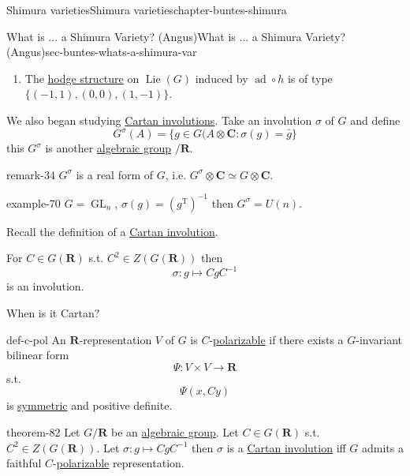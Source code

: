 \documentclass[oneside,10pt,]{book}
\numberwithin{equation}{section}
\newcommand{\Lie}{\operatorname{Lie}}
\newcommand{\inv}{^{-1}}
\newcommand{\RR}{\mathbf{R}}
\newcommand{\CC}{\mathbf{C}}
\newcommand{\transpose}{\mathrm{T}}
\DeclareMathOperator{\ad}{ad}
\DeclareMathOperator{\GL}{GL}
\begin{document}
\begin{chapterptx}{Shimura varieties}{}{Shimura varieties}{}{}{chapter-buntes-shimura}
\begin{sectionptx}{What is ... a Shimura Variety? (Angus)}{}{What is ... a Shimura Variety? (Angus)}{}{}{sec-buntes-whats-a-shimura-var}
\begin{enumerate}
%
\item\hypertarget{li-293}{}The \hyperref[def-hodge-str]{hodge structure} on \(\Lie(G)\) induced by \(\ad \circ h\) is of type \(\{(-1,1), (0,0), (1,-1)\}\).%
\end{enumerate}
%
\par
\hypertarget{p-1215}{}%
We also began studying \hyperref[def-cartan-inv]{Cartan involutions}. Take an involution \(\sigma\) of \(G\) and define%
\begin{equation*}
G^\sigma(A) = \{ g\in G(A \otimes \CC : \sigma(g) = \bar g\}
\end{equation*}
this \(G^\sigma\) is another \hyperref[def-alg-gp]{algebraic group} \(/\RR\).%
\begin{remark}{}{remark-34}%
\hypertarget{p-1216}{}%
\(G^\sigma\) is a real form of \(G\), i.e. \(G^\sigma \otimes \CC \simeq G \otimes \CC\).%
\end{remark}
\begin{example}{}{example-70}%
\hypertarget{p-1217}{}%
\(G  =\GL_n\), \(\sigma(g) = (g^\transpose)\inv\) then \(G^\sigma =  U(n)\).%
\end{example}
\hypertarget{p-1218}{}%
Recall the definition of a \hyperref[def-cartan-inv]{Cartan involution}.%
\par
\hypertarget{p-1219}{}%
For \(C \in G(\RR)\) s.t. \(C^2 \in Z(G(\RR))\) then%
\begin{equation*}
\sigma \colon g \mapsto CgC\inv
\end{equation*}
is an involution.%
\par
\hypertarget{p-1220}{}%
When is it Cartan?%
\begin{definition}{}{def-c-pol}%
\hypertarget{p-1221}{}%
An \(\RR\)-representation \(V\) of \(G\) is \(C\)-\hyperref[def-polarizable]{polarizable} if there exists a \(G\)-invariant bilinear form%
\begin{equation*}
\Psi \colon V \times V \to \RR
\end{equation*}
s.t.%
\begin{equation*}
\Psi(x,Cy)
\end{equation*}
is \hyperref[def-princ-pol]{symmetric} and positive definite.%
\end{definition}
\begin{theorem}{}{}{theorem-82}%
\hypertarget{p-1222}{}%
Let \(G/\RR\) be an \hyperref[def-alg-gp]{algebraic group}. Let \(C  \in G(\RR)\) s.t. \(C^2 \in Z(G(\RR))\). Let \(\sigma \colon g\mapsto Cg C\inv\)  then \(\sigma\) is a \hyperref[def-cartan-inv]{Cartan involution} iff \(G\) admits a faithful \(C\)-\hyperref[def-polarizable]{polarizable} representation.%

\end{theorem}
\end{sectionptx}
\end{chapterptx}
\end{document}
